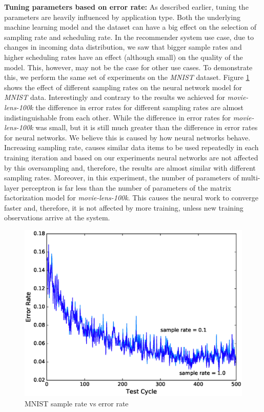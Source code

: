 \documentclass{vldb}
\begin{document}
\textbf{Tuning parameters based on error rate:} As described earlier, tuning the parameters are heavily influenced by application type.
Both the underlying machine learning model and the dataset can have a big effect on the selection of sampling rate and scheduling rate.
In the recommender system use case, due to changes in incoming data distribution, we saw that bigger sample rates and higher scheduling rates have an effect (although small) on the quality of the model.
This, however, may not be the case for other use cases.
To demonstrate this, we perform the same set of experiments on the \textit{MNIST} dataset.
Figure \ref{fig:mnist-sample-rate} shows the effect of different sampling rates on the neural network model for \textit{MNIST} data.
Interestingly and contrary to the results we achieved for \textit{movie-lens-100k} the difference in error rates for different sampling rates are almost indistinguishable from each other.
While the difference in error rates for \textit{movie-lens-100k} was small, but it is still much greater than the difference in error rates for neural networks.
We believe this is caused by how neural networks behave.
Increasing sampling rate, causes similar data items to be used repeatedly in each training iteration and based on our experiments neural networks are not affected by this oversampling and, therefore, the results are almost similar with different sampling rates.
Moreover, in this experiment, the number of parameters of multi-layer perceptron is far less than the number of parameters of the matrix factorization model for \textit{movie-lens-100k}.
This causes the neural work to converge faster and, therefore, it is not affected by more training, unless new training observations arrive at the system.

\begin{figure}[!ht]
\centering
\includegraphics[width=\columnwidth]{../images/experiment-results/mnist-sampling.eps}
\caption{MNIST sample rate vs error rate}
\label{fig:mnist-sample-rate}
\end{figure}
\end{document}
